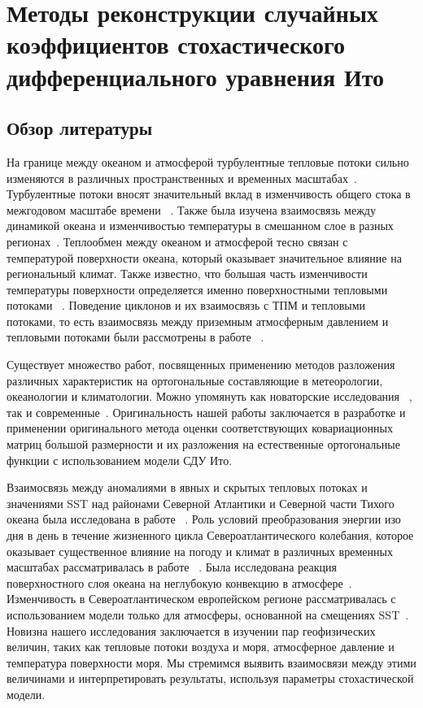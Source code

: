 \chapter{Методы реконструкции случайных коэффициентов стохастического дифференциального уравнения Ито}
\label{ch:Methods}

\section{Обзор литературы}
\label{sec:ch1/SecWorks}

На границе между океаном и атмосферой турбулентные тепловые потоки сильно изменяются в различных пространственных и временных масштабах~\cite{small2019air, tian2017air}. Турбулентные потоки вносят значительный вклад в изменчивость общего стока в межгодовом масштабе времени ~\cite{bentamy2017review}.
Также была изучена взаимосвязь между динамикой океана и изменчивостью температуры в смешанном слое в разных регионах~\cite{ashin2019observed, schmeisser2019role}. Теплообмен между океаном и атмосферой тесно связан с температурой поверхности океана, который оказывает значительное влияние на региональный климат. Также известно, что большая часть изменчивости температуры поверхности определяется именно поверхностными тепловыми потоками ~\cite{patrizio2021quantifying}. 
Поведение циклонов и их взаимосвязь с ТПМ и тепловыми потоками, то есть взаимосвязь между приземным атмосферным давлением и тепловыми потоками были рассмотрены в работе ~\cite{tilinina2018association}.

Существует множество работ, посвященных применению методов разложения различных характеристик на ортогональные составляющие в метеорологии, океанологии и климатологии. Можно упомянуть как новаторские исследования ~\cite{lorenz1956empirical, bagrov1959analytic,Obukhov1960,Yudin1968}, так и современные~\cite{kobayashi2015jra}. Оригинальность нашей работы заключается в разработке и применении оригинального метода оценки соответствующих ковариационных матриц большой размерности и их разложения на естественные ортогональные функции с использованием модели СДУ Ито.

Взаимосвязь между аномалиями в явных и скрытых тепловых потоках и значениями SST над районами Северной Атлантики и Северной части Тихого океана была исследована в работе ~\cite{cayan1992latent}. Роль условий преобразования энергии изо дня в день в течение жизненного цикла Североатлантического колебания, которое оказывает существенное влияние на погоду и климат в различных временных масштабах рассматривалась в работе ~\cite{kim2024phase}. Была исследована реакция поверхностного слоя океана на неглубокую конвекцию в атмосфере~\cite{brilouet2024numerical}. Изменчивость в Североатлантическом европейском регионе рассматривалась с использованием модели только для атмосферы, основанной на смещениях SST~\cite{keeley2012impact}. Новизна нашего исследования заключается в изучении пар геофизических величин, таких как тепловые потоки воздуха и моря, атмосферное давление и температура поверхности моря. Мы стремимся выявить взаимосвязи между этими величинами и интерпретировать результаты, используя параметры стохастической модели.



